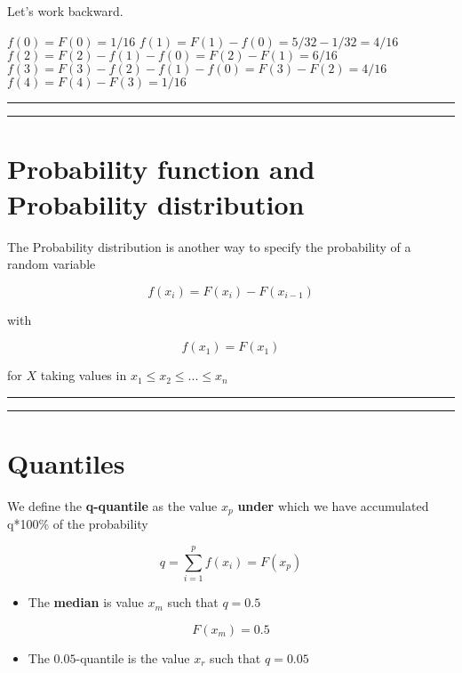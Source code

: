 \documentclass[
]{book}
\providecommand{\tightlist}{%
  \setlength{\itemsep}{0pt}\setlength{\parskip}{0pt}}
\begin{document}
Let's work backward.

\(f(0)=F(0)=1/16\)
\(f(1)=F(1)-f(0)=5/32-1/32=4/16\)
\(f(2)=F(2)-f(1)-f(0)=F(2)-F(1)=6/16\)
\(f(3)=F(3)-f(2)-f(1)-f(0)=F(3)-F(2)=4/16\)
\(f(4)=F(4)-F(3)=1/16\)

\begin{center}\rule{0.5\linewidth}{0.5pt}\end{center}

\begin{center}\rule{0.5\linewidth}{0.5pt}\end{center}

\hypertarget{probability-function-and-probability-distribution-1}{%
\section{Probability function and Probability distribution}\label{probability-function-and-probability-distribution-1}}

The Probability distribution is another way to specify the probability of a random variable

\[f(x_i)=F(x_i)-F(x_{i-1})\]

with

\[f(x_1)=F(x_1)\]

for \(X\) taking values in \(x_1 \leq x_2 \leq ... \leq x_n\)

\begin{center}\rule{0.5\linewidth}{0.5pt}\end{center}

\begin{center}\rule{0.5\linewidth}{0.5pt}\end{center}

\hypertarget{quantiles}{%
\section{Quantiles}\label{quantiles}}

We define the \textbf{q-quantile} as the value \(x_{p}\) \textbf{under} which we have accumulated q*100\% of the probability

\[q=\sum_{i=1}^p f(x_i) = F (x_p)\]

\begin{itemize}
\tightlist
\item
  The \textbf{median} is value \(x_m\) such that \(q=0.5\)
\end{itemize}

\[F(x_{m})=0.5\]

\begin{itemize}
\tightlist
\item
  The \(0.05\)-quantile is the value \(x_{r}\) such that \(q=0.05\)
\end{itemize}
\end{document}
